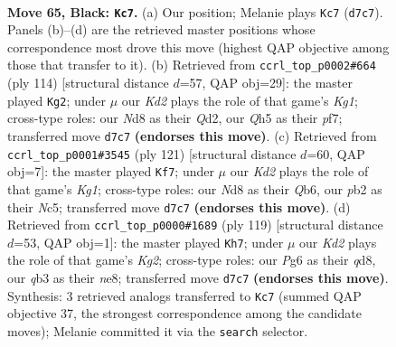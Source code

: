 \documentclass[11pt]{article}
\begin{document}
\clearpage

\begin{figure}[p]\centering
\begin{subfigure}{0.46\textwidth}\centering
\resizebox{\linewidth}{!}{%
\newchessgame
\chessboard[
  setfen={3n4/3k2p1/1pp3p1/p1p4q/8/1QP5/KP6/8 b - - 1 65},
  showmover=false,
  pgfstyle=straightmove, color=movearrow, markmove={d7-c7}
]}
\caption{}
\end{subfigure}\hfill
\begin{subfigure}{0.46\textwidth}\centering
\resizebox{\linewidth}{!}{%
\newchessgame
\chessboard[
  setfen={8/5pk1/p5p1/1p2q2p/1P5P/6P1/1P1Q1P2/6K1 w - - 12 58},
  showmover=false,
  pgfstyle=straightmove, color=movearrow, markmove={g1-g2}
]}
\caption{}
\end{subfigure}
\\[4pt]
\begin{subfigure}{0.46\textwidth}\centering
\resizebox{\linewidth}{!}{%
\newchessgame
\chessboard[
  setfen={6k1/6p1/1q2pp2/2n3p1/6P1/2Q1PB1P/5P2/6K1 b - - 2 61},
  showmover=false,
  pgfstyle=straightmove, color=movearrow, markmove={g8-f7}
]}
\caption{}
\end{subfigure}\hfill
\begin{subfigure}{0.46\textwidth}\centering
\resizebox{\linewidth}{!}{%
\newchessgame
\chessboard[
  setfen={3QN3/q4pk1/4p1pn/4P2p/7P/2p2P2/6PK/8 b - - 4 60},
  showmover=false,
  pgfstyle=straightmove, color=movearrow, markmove={g7-h7}
]}
\caption{}
\end{subfigure}
\caption{\textbf{Move 65, Black: \texttt{Kc7}.} (a) Our position; Melanie plays \texttt{Kc7} (\texttt{d7c7}). Panels (b)--(d) are the retrieved master positions whose correspondence most drove this move (highest QAP objective among those that transfer to it). (b) Retrieved from \texttt{ccrl\_top\_p0002\#664} (ply 114) [structural distance $d$=57, QAP obj=29]: the master played \texttt{Kg2}; under $\mu$ our \emph{Kd2} plays the role of that game's \emph{Kg1}; cross-type roles: our \emph{N}d8 as their \emph{Q}d2, our \emph{Q}h5 as their \emph{p}f7; transferred move \texttt{d7c7} \textbf{(endorses this move)}. (c) Retrieved from \texttt{ccrl\_top\_p0001\#3545} (ply 121) [structural distance $d$=60, QAP obj=7]: the master played \texttt{Kf7}; under $\mu$ our \emph{Kd2} plays the role of that game's \emph{Kg1}; cross-type roles: our \emph{N}d8 as their \emph{Q}b6, our \emph{p}b2 as their \emph{N}c5; transferred move \texttt{d7c7} \textbf{(endorses this move)}. (d) Retrieved from \texttt{ccrl\_top\_p0000\#1689} (ply 119) [structural distance $d$=53, QAP obj=1]: the master played \texttt{Kh7}; under $\mu$ our \emph{Kd2} plays the role of that game's \emph{Kg2}; cross-type roles: our \emph{P}g6 as their \emph{q}d8, our \emph{q}b3 as their \emph{n}e8; transferred move \texttt{d7c7} \textbf{(endorses this move)}. Synthesis: 3 retrieved analogs transferred to \texttt{Kc7} (summed QAP objective 37, the strongest correspondence among the candidate moves); Melanie committed it via the \texttt{search} selector.}
\label{fig:thought-m129}
\end{figure}
\end{document}
